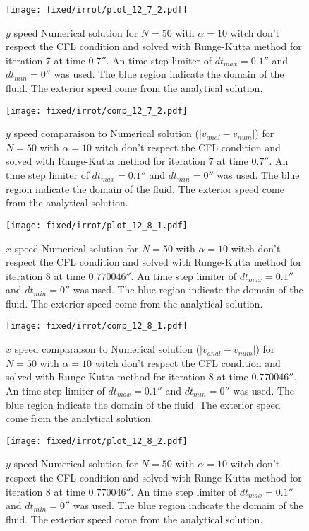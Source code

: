 \begin{figure}
\texttt{[image: fixed/irrot/plot\_12\_7\_2.pdf]}
\caption{$y$ speed Numerical solution for $N=50$ with $\alpha=10$ witch don't respect the CFL condition and solved with Runge-Kutta method
for iteration 7 at time $\unit{0.7}{\second}$.
An time step limiter of $dt_{max}=\unit{0.1}{\second}$ and $dt_{min}=\unit{0}{\second}$ was used.
The blue region indicate the domain of the fluid. The exterior speed come from the analytical solution.
\label{fix:plot_12_7_2}
}
\end{figure}

\begin{figure}
\texttt{[image: fixed/irrot/comp\_12\_7\_2.pdf]}
\caption{$y$ speed comparaison to Numerical solution ($|v_{anal}-v_{num}|$) for $N=50$ with $\alpha=10$ witch don't respect the CFL condition and solved with Runge-Kutta method
for iteration 7 at time $\unit{0.7}{\second}$.
An time step limiter of $dt_{max}=\unit{0.1}{\second}$ and $dt_{min}=\unit{0}{\second}$ was used.
The blue region indicate the domain of the fluid. The exterior speed come from the analytical solution.
\label{fix:comp_12_7_2}
}
\end{figure}

\begin{figure}
\texttt{[image: fixed/irrot/plot\_12\_8\_1.pdf]}
\caption{$x$ speed Numerical solution for $N=50$ with $\alpha=10$ witch don't respect the CFL condition and solved with Runge-Kutta method
for iteration 8 at time $\unit{0.770046}{\second}$.
An time step limiter of $dt_{max}=\unit{0.1}{\second}$ and $dt_{min}=\unit{0}{\second}$ was used.
The blue region indicate the domain of the fluid. The exterior speed come from the analytical solution.
\label{fix:plot_12_8_1}
}
\end{figure}

\begin{figure}
\texttt{[image: fixed/irrot/comp\_12\_8\_1.pdf]}
\caption{$x$ speed comparaison to Numerical solution ($|v_{anal}-v_{num}|$) for $N=50$ with $\alpha=10$ witch don't respect the CFL condition and solved with Runge-Kutta method
for iteration 8 at time $\unit{0.770046}{\second}$.
An time step limiter of $dt_{max}=\unit{0.1}{\second}$ and $dt_{min}=\unit{0}{\second}$ was used.
The blue region indicate the domain of the fluid. The exterior speed come from the analytical solution.
\label{fix:comp_12_8_1}
}
\end{figure}

\begin{figure}
\texttt{[image: fixed/irrot/plot\_12\_8\_2.pdf]}
\caption{$y$ speed Numerical solution for $N=50$ with $\alpha=10$ witch don't respect the CFL condition and solved with Runge-Kutta method
for iteration 8 at time $\unit{0.770046}{\second}$.
An time step limiter of $dt_{max}=\unit{0.1}{\second}$ and $dt_{min}=\unit{0}{\second}$ was used.
The blue region indicate the domain of the fluid. The exterior speed come from the analytical solution.
\label{fix:plot_12_8_2}
}
\end{figure}

